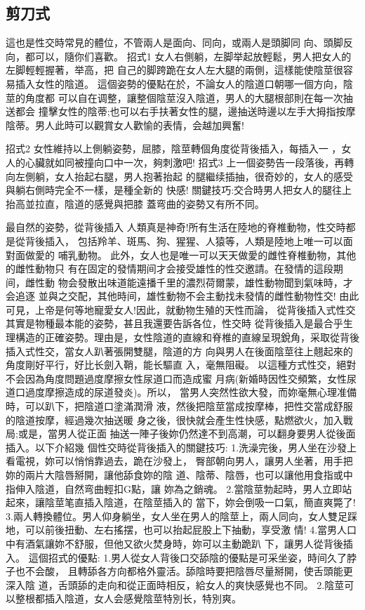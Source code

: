 \documentclass[12pt,UTF8]{ctexbook}
\begin{document}
\subsection{剪刀式}

這也是性交時常見的體位，不管兩人是面向、同向，或兩人是頭脚同
向、頭脚反向，都可以，隨你们喜歡。
招式1
女人右側躺，左脚举起放輕鬆，男人把女人的左脚輕輕握著，举高，把
自己的脚跨跪在女人左大腿的兩側，這樣能使陰莖很容易插入女性的陰道。
這個姿勢的優點在於，不論女人的陰道口朝哪一個方向，陰莖的角度都
可以自在调整，讓整個陰莖沒入陰道，男人的大腿根部則在每一次抽送都会
撞擊女性的陰蒂;也可以右手扶著女性的腿，邊抽送時邊以左手大拇指按摩
陰蒂。男人此時可以觀賞女人歡愉的表情，会越加興奮!

招式2
女性維持以上側躺姿勢，屈膝，陰莖轉個角度從背後插入，每插入一
，女人的心臟就如同被撞向口中一次，夠刺激吧!
招式3
上一個姿勢告一段落後，再轉向左側躺，女人抬起右腿，男人抱著抬起
的腿繼续插抽，很奇妙的，女人的感受與躺右側時完全不一樣，是種全新的
快感!
關鍵技巧:交合時男人把女人的腿往上抬高並拉直，陰道的感覺與把膝
蓋弯曲的姿勢又有所不同。

最自然的姿勢，從背後插入
人類真是神奇!所有生活在陸地的脊椎動物，性交時都是從背後插入，
包括羚羊、斑馬、狗、猩猩、人猿等，人類是陸地上唯一可以面對面做愛的
哺乳動物。
此外，女人也是唯一可以天天做愛的雌性脊椎動物，其他的雌性動物只
有在固定的發情期间才会接受雄性的性交邀請。在發情的這段期间，雌性動
物会發散出味道能遠播千里的濃烈荷爾蒙，雄性動物聞到氣味時，才会追逐
並與之交配，其他時间，雄性動物不会主動找未發情的雌性動物性交!
由此可見，上帝是何等地寵愛女人!因此，就動物生殖的天性而論，
從背後插入式性交其實是物種最本能的姿勢，甚且我還要告訴各位，性交時
從背後插入是最合乎生理構造的正確姿勢。理由是，女性陰道的直線和脊椎的直線呈現銳角，采取從背後插入式性交，當女人趴著張開雙腿，陰道的方
向與男人在後面陰莖往上翹起來的角度剛好平行，好比长劍入鞘，能长驅直
入，毫無阻礙。
以這種方式性交，絕對不会因為角度問題過度摩擦女性尿道口而造成蜜
月病(新婚時因性交頻繁，女性尿道口過度摩擦造成的尿道發炎)。所以，
當男人突然性欲大發，而妳毫無心理准備時，可以趴下，把陰道口塗滿潤滑
液，然後把陰莖當成按摩棒，把性交當成舒服的陰道按摩，經過幾次抽送暖
身之後，很快就会產生性快感，點燃欲火，加入戰局;或是，當男人從正面
抽送一陣子後妳仍然達不到高潮，可以翻身要男人從後面插入。以下介紹幾
個性交時從背後插入的關鍵技巧:
1.洗澡完後，男人坐在沙發上看電視，妳可以悄悄靠過去，跪在沙發上，
臀部朝向男人，讓男人坐著，用手把妳的兩片大陰唇掰開，讓他舔食妳的陰
道、陰蒂、陰唇，也可以讓他用食指或中指伸入陰道，自然弯曲輕扣G點，讓
妳為之銷魂。
2.當陰莖勃起時，男人立即站起來，讓陰莖笔直插入陰道，在陰莖插入的
當下，妳会倒吸一口氣，簡直爽斃了!
3.兩人轉換體位。男人仰身躺坐，女人坐在男人的陰莖上，兩人同向，女人雙足踩地，可以前後扭動、左右搖摆，也可以抬起屁股上下抽動，享受激
情!
4.當男人口中有酒氣讓妳不舒服，但他又欲火焚身時，妳可以主動跪趴
下，讓男人從背後插入。
這個招式的優點:
1.男人從女人背後口交舔陰的優點是可采坐姿，時间久了脖子也不会酸，
且轉舔各方向都格外靈活。舔陰時要把陰唇尽量掰開，使舌頭能更深入陰
道，舌頭舔的走向和從正面時相反，給女人的爽快感覺也不同。
2.陰莖可以整根都插入陰道，女人会感覺陰莖特別长，特別爽。
\end{document}
